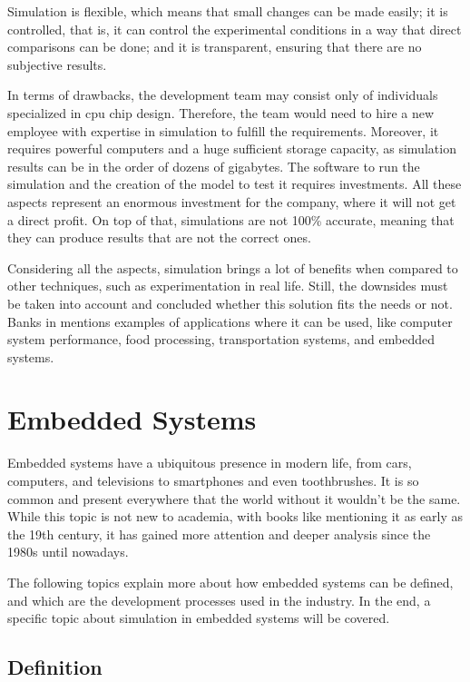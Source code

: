 Simulation is flexible, which means that small changes can be made easily; it is controlled, that is, it can control the experimental conditions 
in a way that direct comparisons can be done; and it is transparent, ensuring that there are no subjective results.

In terms of drawbacks, the development team may consist only of individuals specialized in \gls{cpu} chip design. Therefore, 
the team would need to hire a new employee with expertise in simulation to fulfill the requirements. Moreover, it requires powerful computers 
and a huge sufficient storage capacity, as simulation results can be in the order of dozens of gigabytes. The software to run the simulation and 
the creation of the model to test it requires investments. All these aspects represent an enormous investment for the company, where it will not get 
a direct profit. On top of that, simulations are not 100\% accurate, meaning that they can produce results that are not the correct ones.

Considering all the aspects, simulation brings a lot of benefits when compared to other techniques, such as experimentation in real life. 
Still, the downsides must be taken into account and concluded whether this solution fits the needs or not. Banks in 
\cite{BanksDiscreteSimulation} mentions examples of applications where it can be used, like computer system performance, food processing, 
transportation systems, and embedded systems.


\section{Embedded Systems}

Embedded systems have a ubiquitous presence in modern life, from cars, computers, and televisions to smartphones and even toothbrushes. It is 
so common and present everywhere that the world without it wouldn't be the same. While this topic is not new to academia, with books like 
\cite{banks1999introduction} mentioning it as early as the 19th century, it has gained more attention and deeper analysis since the 1980s until 
nowadays. 

The following topics explain more about how embedded systems can be defined, and which are the development processes used in the industry. 
In the end, a specific topic about simulation in embedded systems will be covered.

\subsection{Definition}

